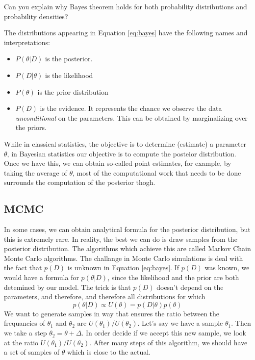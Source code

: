 \begin{example}
\begin{exercise} Can you explain why Bayes theorem holds for both probability distributions and probability densities?
\end{exercise}


The distributions appearing in Equation \eqref{eq:bayes} have the following names and interpretations:
\begin{itemize}
\item $P(\theta|D)$ is the posterior.
\item $P(D|\theta)$ is the likelihood
\item $P(\theta)$ is the prior distribution
\item $P(D)$ is the evidence. It represents the chance we observe the data \emph{unconditional} on the parameters. This can be obtained by marginalizing over the priors.
\end{itemize}
While in classical statistics, the objective is to determine (estimate) a parameter $\theta$, in Bayesian statistics our objective is to compute the posteior distribution. Once we have this, we can obtain so-called {\dfn point estimates}, for example, by taking the average of $\theta$, most of the computational work that needs to be done surrounds the computation of the posterior thogh.


\subsection{MCMC}
In some cases, we can obtain analytical formula for the posterior distribution, but this is extremely rare. In reality, the best we can do is draw samples from the posterior distribution. The algorithms which achieve this are called Markov Chain Monte Carlo algorithms. The challange in Monte Carlo simulations is deal with the fact that $p(D)$ is unknown in Equation \eqref{eq:bayes}. If $p(D)$ was known, we would have a formula for $p(\theta|D)$, since the likelihood and the prior are both detemined by our model. The trick is that $p(D)$ doesn't depend on the parameters, and therefore, and therefore all distributions for which
\begin{equation}
  p(\theta|D) \propto U(\theta) = p(D|\theta)p(\theta)
\end{equation}
We want to generate samples in way that ensures the ratio between the frequancies of $\theta_1$ and $\theta_2$ are $U(\theta_1)/U(\theta_2)$. Let's say we have a sample $\theta_1$. Then we take a step  $\theta_2 = \theta + \Delta$. In order decide if we accept this new sample, we look at the ratio $U(\theta_1)/U(\theta_2)$. After many steps of this algorithm, we should have a set of samples of $\theta$ which is close to the actual.





\end{example}
